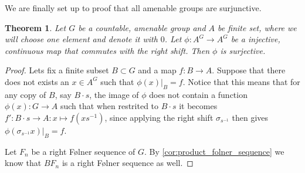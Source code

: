 \documentclass[titlepage, a4paper]{article}
\newtheorem{theorem}{Theorem}[section]
\theoremstyle{definition}
\theoremstyle{remark}
\begin{document}
We are finally set up to proof that all amenable groups are surjunctive.
\begin{theorem}
	Let $G$ be a countable, amenable group and  $A$ be finite set, where we will choose one element and denote it with $0$. Let  $\phi: A^{G} \to A^{G}$ be a injective, continuous map that commutes with the right shift. Then $\phi$ is surjective.
\end{theorem}

\begin{proof}
	Lets fix a finite subset $B \subset G$ and a map $f:B\to A$. 
	Suppose that there does not exists an $x \in A^{G}$ such that $\phi(x)|_B = f$.
	Notice that this means that for any copy of $B$, say  $B\cdot s$, the image of $\phi$ does not contain a function  $\phi(x): G \to A$ such that when restrited to  $B\cdot s$ it becomes $f': B\cdot s \to A: x \mapsto f\left( x s^{-1} \right) $, since applying the right shift $\sigma_{s^{-1}}$ then gives $\phi(\sigma_{s^{-1}} x) |_{B} = f$.

	Let $F_n$ be a right Følner sequence of $G$. By \cref{cor:product_folner_sequence} we know that $BF_n$ is a right Følner sequence as well. 


\end{proof}
\end{document}
